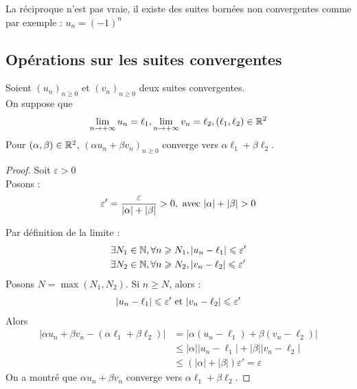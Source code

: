 \begin{remarque}
    La réciproque n'est pas vraie, il existe des suites bornées non convergentes comme par exemple : $u_n = (-1)^{n}$
\end{remarque}

\subsection{Opérations sur les suites convergentes}

\begin{graybox}
    \begin{theoreme}[]
    \par \noindent Soient $(u_n)_{n \geq 0}$ et $(v_n)_{n \geq 0}$ deux suites convergentes. \\
    On suppose que
    \begin{align*}
        \lim_{n \to +\infty} u_n = \ell_1, \lim_{n \to +\infty} v_n = \ell_2, (\ell_1, \ell_2) \in \R^2
    \end{align*}
    Pour $(\alpha, \beta) \in \R^2$, $(\alpha u_n + \beta v_n)_{n \geq 0}$ converge vers $\alpha \ell_1 + \beta \ell_2$.
\end{theoreme}
\end{graybox}

\begin{proof}
        Soit $\varepsilon > 0$ \\
        Posons : 
        \begin{align*}
            \varepsilon ' = \frac{\varepsilon}{|\alpha| + |\beta|} > 0, \textnormal{ avec } |\alpha| + |\beta| > 0
        \end{align*}
        \par \noindent Par définition de la limite :
        \begin{align*}
            &\exists N_1 \in \N, \forall n \geq N_1, |u_n - \ell_1| \leq \varepsilon' \\
            &\exists N_2 \in \N, \forall n \geq N_2, |v_n - \ell_2| \leq \varepsilon'
        \end{align*}
        Posons $N = \max(N_1, N_2)$. Si $n \geq N$, alors :
        \begin{align*}
            |u_n - \ell_1| \leq \varepsilon' \textnormal{ et } |v_n - \ell_2| \leq \varepsilon'
        \end{align*}
        Alors
        \begin{align*}
        |\alpha u_n + \beta v_n - (\alpha \ell_1 + \beta \ell_2)| &= |\alpha(u_n - \ell_1) + \beta(v_n - \ell_2)| \\
        & \leq |\alpha| |u_n - \ell_1| + |\beta| |v_n - \ell_2| \\
        &\leq (|\alpha| + |\beta|)\varepsilon' = \varepsilon 
        \end{align*}
        On a montré que $\alpha u_n + \beta v_n$ converge vers $\alpha \ell_1 + \beta \ell_2$.
    \end{proof}

